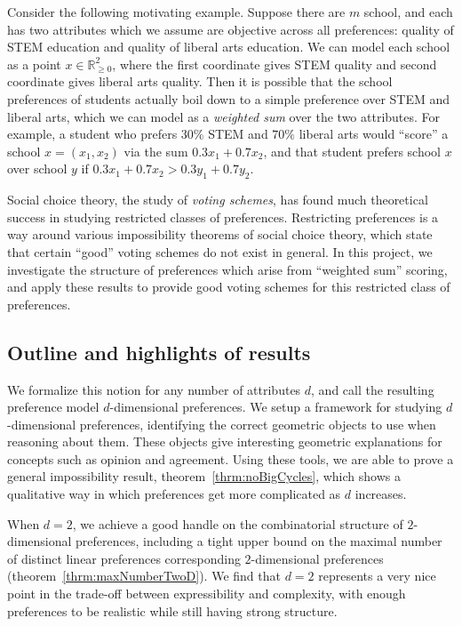 \documentclass[12pt]{article}
\newcommand{\Rgz}{\mathbb{R}_{\ge 0}}
\newcommand{\1}[1]{\mathds{1}[{#1}]}
\begin{document}
  Consider the following motivating example.
  Suppose there are $m$ school, and each has two attributes
  which we assume are objective across all preferences:
  quality of STEM education and quality of liberal arts education.
  We can model each school as a point $x\in \Rgz^2$, where the first coordinate
  gives STEM quality and second coordinate gives liberal arts quality.
  Then it is possible that the school preferences of students
  actually boil down to a simple preference over STEM and liberal arts,
  which we can model as a \emph{weighted sum} over the two attributes.
  For example, a student who prefers $30\%$ STEM and $70\%$ liberal arts
  would ``score'' a school $x = (x_1, x_2)$ via the sum
  $0.3 x_1 + 0.7 x_2$, and that student prefers school $x$ over school $y$
  if $0.3 x_1 + 0.7 x_2 > 0.3 y_1 + 0.7 y_2$.

  Social choice theory, the study of \emph{voting schemes},
  has found much theoretical success in studying restricted classes of preferences.
  Restricting preferences is a way around various impossibility theorems of
  social choice theory, which state that certain ``good'' voting schemes do not
  exist in general. In this project, we investigate the structure of preferences
  which arise from ``weighted sum'' scoring, and apply these results to provide
  good voting schemes for this restricted class of preferences.

  \subsection{Outline and highlights of results}
    We formalize this notion for any number of attributes $d$,
    and call the resulting preference model $d$-dimensional preferences.
    We setup a framework for studying $d$-dimensional preferences,
    identifying the correct geometric objects to use when reasoning about them.
    These objects give interesting geometric explanations for concepts such as
    opinion and agreement.
    Using these tools, we are able to prove a general impossibility result,
    theorem~\ref{thrm:noBigCycles}, which shows
    a qualitative way in which preferences get more complicated as $d$ increases.

    When $d=2$, we achieve a good handle on the combinatorial structure of
    $2$-dimensional preferences, including
    a tight upper bound on the maximal number of
    distinct linear preferences corresponding
    $2$-dimensional preferences (theorem~\ref{thrm:maxNumberTwoD}).
    We find that $d=2$ represents a very nice point in the trade-off
    between expressibility and complexity, with enough preferences to be
    realistic while still having strong structure.
\end{document}
